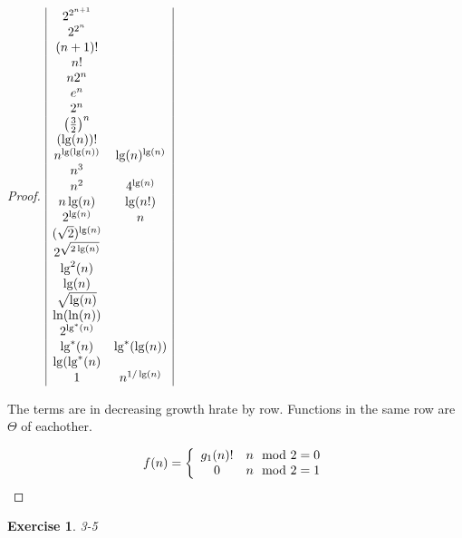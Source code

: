 \documentclass{article}
\newtheorem{th1}{Exercise}
\begin{document}
\begin{proof}
\item
$
\begin{array}{|c c|}
2^{2^{n+1}}&\\
2^{2^n}&\\
(n+1)!&\\
n!&\\
n2^n&\\
e^n&\\
2^n&\\
\left(\frac{3}{2}\right)^n&\\
(\lg(n))!&\\
 n^{\lg(\lg(n))}&\lg(n)^{\lg(n)}\\
 n^3&\\
  n^2& 4^{\lg(n)}\\
  n\lg(n)&\lg(n!)\\
  2^{\lg(n)}&n\\
  (\sqrt{2})^{\lg(n)}&\\
  2^{\sqrt{2\lg(n)}}&\\
  \lg^2(n)&\\
  \lg(n)&\\
  \sqrt{\lg(n)}&\\
  \ln(\ln(n))&\\
  2^{\lg^*(n)}&\\
  \lg^*(n) &\lg^*(\lg(n))\\
  \lg(\lg^*(n)&\\
  1&n^{1/\lg(n)}

\end{array}
$


The terms are in decreasing growth hrate by row. Functions in the same row are $\Theta$ of eachother.
\item

\[
f(n) = \left\{\begin{array}{c c}g_1(n)!& n\mod 2=0 \\0 &n\mod 2 =1\end{array}\right.
\]
\end{proof}
\begin{th1}\label{ex11}
3-5
\end{th1}
\end{document}
